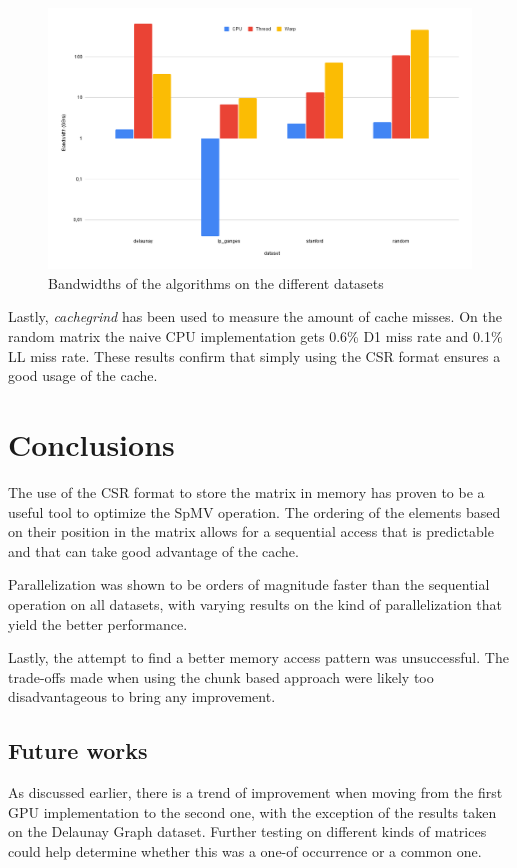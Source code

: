 \documentclass[conference]{IEEEtran}
\begin{document}
\begin{figure}
    \centering
    \includegraphics[width=0.95\linewidth]{images/chart.png}
    \caption{Bandwidths of the algorithms on the different datasets}
    \label{fig:chart}
\end{figure}

Lastly, \textit{cachegrind} has been used to measure the amount of cache misses. On the random matrix the naive CPU implementation gets 0.6\% D1 miss rate and 0.1\% LL miss rate. These results confirm that simply using the CSR format ensures a good usage of the cache.

\section{Conclusions}
The use of the CSR format to store the matrix in memory has proven to be a useful tool to optimize the SpMV operation. The ordering of the elements based on their position in the matrix allows for a sequential access that is predictable and that can take good advantage of the cache.

Parallelization was shown to be orders of magnitude faster than the sequential operation on all datasets, with varying results on the kind of parallelization that yield the better performance.

Lastly, the attempt to find a better memory access pattern was unsuccessful. The trade-offs made when using the chunk based approach were likely too disadvantageous to bring any improvement.

\subsection{Future works}
As discussed earlier, there is a trend of improvement when moving from the first GPU implementation to the second one, with the exception of the results taken on the Delaunay Graph dataset. Further testing on different kinds of matrices could help determine whether this was a one-of occurrence or a common one.
\end{document}
